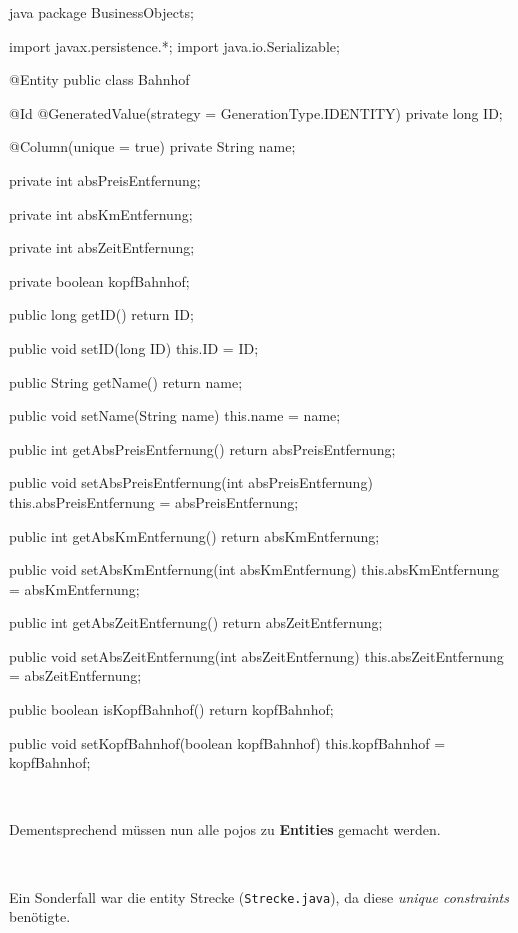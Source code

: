 \begin{code}{java}
package BusinessObjects;

import javax.persistence.*;
import java.io.Serializable;

@Entity
public class Bahnhof {
	@Id
	@GeneratedValue(strategy = GenerationType.IDENTITY)
	private long ID;

	@Column(unique = true)
	private String name;

	private int absPreisEntfernung;

	private int absKmEntfernung;

	private int absZeitEntfernung;

	private boolean kopfBahnhof;

    public long getID() {
        return ID;
    }

    public void setID(long ID) {
        this.ID = ID;
    }

    public String getName() {
        return name;
    }

    public void setName(String name) {
        this.name = name;
    }

    public int getAbsPreisEntfernung() {
        return absPreisEntfernung;
    }

    public void setAbsPreisEntfernung(int absPreisEntfernung) {
        this.absPreisEntfernung = absPreisEntfernung;
    }

    public int getAbsKmEntfernung() {
        return absKmEntfernung;
    }

    public void setAbsKmEntfernung(int absKmEntfernung) {
        this.absKmEntfernung = absKmEntfernung;
    }

    public int getAbsZeitEntfernung() {
        return absZeitEntfernung;
    }

    public void setAbsZeitEntfernung(int absZeitEntfernung) {
        this.absZeitEntfernung = absZeitEntfernung;
    }

    public boolean isKopfBahnhof() {
        return kopfBahnhof;
    }

    public void setKopfBahnhof(boolean kopfBahnhof) {
        this.kopfBahnhof = kopfBahnhof;
    }
}
\end{code}

\

Dementsprechend müssen nun alle \gls{pojo}s zu \textbf{Entities} gemacht werden.

\

Ein Sonderfall war die \gls{entity} Strecke (\texttt{Strecke.java}), da diese \textit{unique constraints} benötigte.

